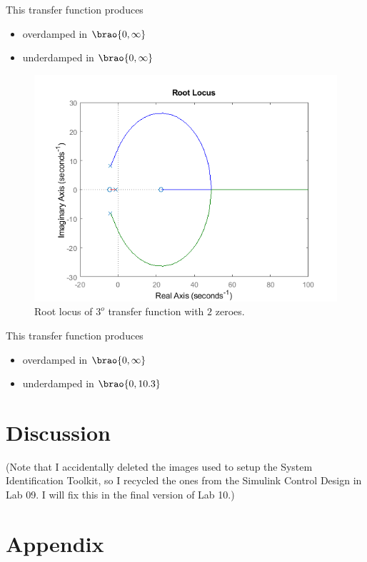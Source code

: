 \documentclass[12pt]{article}
\DeclarePairedDelimiter\brao()%
\begin{document}
This transfer function produces
\begin{itemize}
    \item overdamped in $\brao{0, \infty}$
    \item underdamped in $\brao{0, \infty}$
\end{itemize}

\begin{figure}
    \centering
    \includegraphics[width=\linewidth]{img/task07_110_rlocus.png}
    \caption{Root locus of $3^o$ transfer function with $2$ zeroes.}
    \label{fig:task rlocus 3o/2}
\end{figure}

This transfer function produces
\begin{itemize}
    \item overdamped in $\brao{0, \infty}$
    \item underdamped in $\brao{0, 10.3}$
\end{itemize}

\section{Discussion}\label{sec:Discussion}

(Note that I accidentally deleted the images used to setup the System Identification Toolkit, so I recycled the ones from the Simulink Control Design in Lab 09. I will fix this in the final version of Lab 10.)

\newpage
\printbibliography

\newpage
\appendix
\section{Appendix}\label{app}
\end{document}
